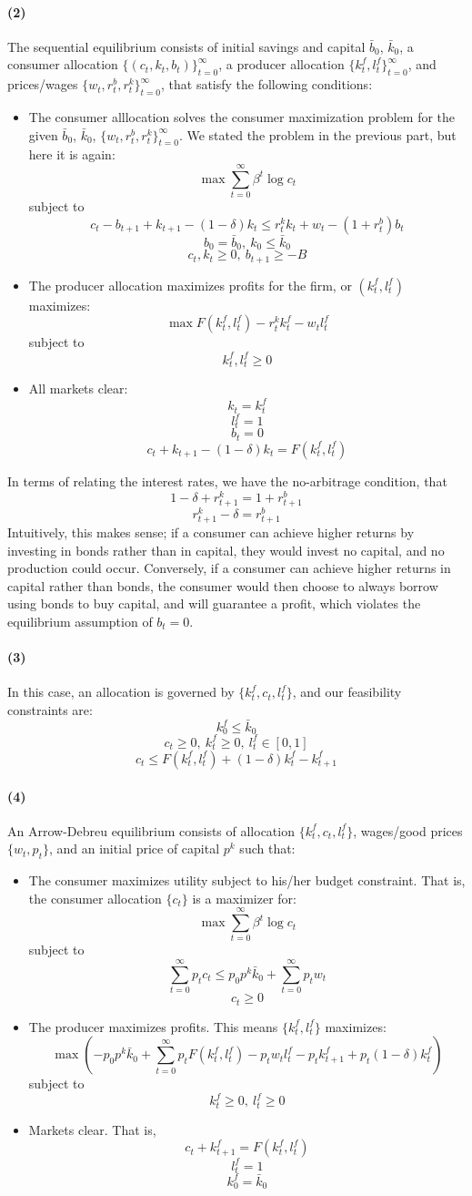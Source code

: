\documentclass[10pt,letter]{article}
\newcommand{\problempart}[1]{\paragraph{#1}}
\begin{document}
\problempart{(2)}
The sequential equilibrium consists of initial savings and capital $\bar{b}_0$, $\bar{k}_0$, a consumer allocation $\{ (c_t, k_t, b_t) \}_{t=0}^\infty$, a producer allocation $\{ k_t^f, l_t^f \}_{t=0}^\infty$, and prices/wages $\{ w_t, r_t^b, r_t^k \}_{t=0}^\infty$, that satisfy the following conditions:
\begin{itemize}
\item The consumer alllocation solves the consumer maximization problem for the given $\bar{b}_0$, $\bar{k}_0$, $\{ w_t, r_t^b, r_t^k \}_{t=0}^\infty$. We stated the problem in the previous part, but here it is again:
\[ \max \sum_{t=0}^\infty \beta^t \log c_t\]
subject to
\[ c_t - b_{t+1} + k_{t+1} - (1-\delta) k_t \le r_t^k k_t + w_t - (1+r_t^b )b_t \]
\[ b_0 = \bar{b}_0, \ k_0 \le \bar{k}_0 \]
\[ c_t, k_t \ge 0, \ b_{t+1} \ge -B\]
\item The producer allocation maximizes profits for the firm, or $(k_t^f, l_t^f)$ maximizes:
\[ \max F(k_t^f, l_t^f) - r_t^k k_t^f - w_tl_t^f\]
subject to
\[ k_t^f, l_t^f \ge 0 \]
\item All markets clear:
\[ k_t = k_t^f \]
\[ l_t^f = 1 \]
\[ b_t = 0 \]
\[ c_t + k_{t+1} - (1-\delta) k_t = F(k_t^f, l_t^f) \]
\end{itemize}
In terms of relating the interest rates, we have the no-arbitrage condition, that
\[ 1-\delta +r^k_{t+1} = 1+ r^b_{t+1}\]
\[ r^k_{t+1} - \delta = r^b_{t+1}\]
Intuitively, this makes sense; if a consumer can achieve higher returns by investing in bonds rather than in capital, they would invest no capital, and no production could occur. Conversely, if a consumer can achieve higher returns in capital rather than bonds, the consumer would then choose to always borrow using bonds to buy capital, and will guarantee a profit, which violates the equilibrium assumption of $b_t = 0$.
\problempart{(3)} In this case, an allocation is governed by $\{ k_t^f, c_t, l_t^f \}$, and our feasibility constraints are:
\[ k_0^f \le \bar{k}_0 \]
\[ c_t \ge 0, \ k_t^f \ge 0, \ l_t^f \in [0,1] \]
\[ c_t \le F(k_t^f, l_t^f) + (1-\delta)k_t^f - k_{t+1}^f \]
\problempart{(4)} An Arrow-Debreu equilibrium consists of allocation $\{ k_t^f, c_t, l_t^f \}$, wages/good prices $\{ w_t, p_t \}$, and an initial price of capital $p^k$ such that:
\begin{itemize}
\item The consumer maximizes utility subject to his/her budget constraint. That is, the consumer allocation $\{ c_t \}$ is a maximizer for:
\[ \max \sum_{t=0}^\infty \beta^t \log c_t  \]
subject to
\[ \sum_{t=0}^\infty p_t c_t \le p_0 p^k \bar{k}_0 + \sum_{t=0}^\infty p_t w_t \]
\[ c_t \ge 0\]
\item The producer maximizes profits. This means $\{ k_t^f, l_t^f \}$ maximizes:
\[ \max \left(-p_0 p^k \bar{k}_0 + \sum_{t=0}^\infty p_t F(k_t^f, l_t^f) - p_tw_tl_t^f - p_tk^f_{t+1} + p_t(1-\delta)k^f_t \right) \]
subject to
\[ k^f_t\ge 0, \ l^f_t \ge 0  \]
\item Markets clear. That is,
\[ c_t + k^f_{t+1} = F(k^f_t, l^f_t) \]
\[ l_t^f = 1 \]
\[ k^f_0 = \bar{k}_0 \]
\end{itemize}
\end{document}
